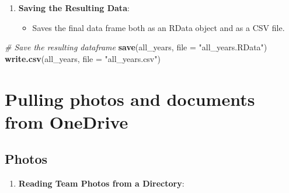 \documentclass[
]{book}
\newenvironment{Shaded}{\begin{snugshade}}{\end{snugshade}}
\newcommand{\AttributeTok}[1]{\textcolor[rgb]{0.13,0.29,0.53}{#1}}
\newcommand{\CommentTok}[1]{\textcolor[rgb]{0.56,0.35,0.01}{\textit{#1}}}
\newcommand{\ConstantTok}[1]{\textcolor[rgb]{0.56,0.35,0.01}{#1}}
\newcommand{\FunctionTok}[1]{\textcolor[rgb]{0.13,0.29,0.53}{\textbf{#1}}}
\newcommand{\NormalTok}[1]{#1}
\newcommand{\OtherTok}[1]{\textcolor[rgb]{0.56,0.35,0.01}{#1}}
\newcommand{\SpecialCharTok}[1]{\textcolor[rgb]{0.81,0.36,0.00}{\textbf{#1}}}
\newcommand{\StringTok}[1]{\textcolor[rgb]{0.31,0.60,0.02}{#1}}
\providecommand{\tightlist}{%
  \setlength{\itemsep}{0pt}\setlength{\parskip}{0pt}}
\begin{document}
\begin{enumerate}
\def\labelenumi{\arabic{enumi}.}
\setcounter{enumi}{9}
\tightlist
\item
  \textbf{Saving the Resulting Data}:

  \begin{itemize}
  \tightlist
  \item
    Saves the final data frame both as an RData object and as a CSV file.
  \end{itemize}
\end{enumerate}

\begin{Shaded}
\begin{Highlighting}[]
\CommentTok{\# Save the resulting dataframe}
\FunctionTok{save}\NormalTok{(all\_years, }\AttributeTok{file =} \StringTok{"all\_years.RData"}\NormalTok{)}
\FunctionTok{write.csv}\NormalTok{(all\_years, }\AttributeTok{file =} \StringTok{"all\_years.csv"}\NormalTok{)}
\end{Highlighting}
\end{Shaded}

\hypertarget{pulling-photos-and-documents-from-onedrive}{%
\section{Pulling photos and documents from OneDrive}\label{pulling-photos-and-documents-from-onedrive}}

\hypertarget{photos}{%
\subsection{Photos}\label{photos}}

\begin{enumerate}
\def\labelenumi{\arabic{enumi}.}
\tightlist
\item
  \textbf{Reading Team Photos from a Directory}:
\end{enumerate}

\begin{Shaded}
\end{Shaded}
\end{document}
